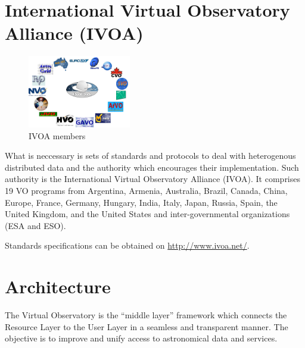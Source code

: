     
\section{International Virtual Observatory Alliance (IVOA)}

   \begin{figure}
     \vspace{0pt}
     \begin{center}
       \includegraphics[width=0.4\textwidth]{ivoamembers}
     \end{center}
     \vspace{-20pt}
     \caption{IVOA members}
     \vspace{-10pt}
   \end{figure}


    What is neccessary is sets of standards and protocols to deal with
    heterogenous distributed data and the authority which encourages
    their implementation. Such authority is the International Virtual
    Observatory Alliance (IVOA). It comprises 19 VO programs from
    Argentina, Armenia, Australia, Brazil, Canada, China, Europe,
    France, Germany, Hungary, India, Italy, Japan, Russia, Spain, the
    United Kingdom, and the United States and inter-governmental
    organizations (ESA and ESO)\cite{hanisch2010international}.
   
    Standards specifications can be obtained on \url{http://www.ivoa.net/}.



\section{Architecture}
    The Virtual Observatory is the  “middle layer” framework
    which connects the Resource Layer to the User Layer in a seamless
    and transparent manner. The objective is to improve and unify access to
    astronomical data and services.

